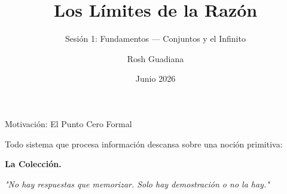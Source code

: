 \documentclass[10pt, aspectratio=169]{beamer}
\title{Los Límites de la Razón}
\subtitle{Sesión 1: Fundamentos — Conjuntos y el Infinito}
\author{Rosh Guadiana}
\date{Junio 2026}
\begin{document}
\maketitle

\begin{frame}{Motivación: El Punto Cero Formal}
    \begin{center}
        \Large Todo sistema que procesa información descansa sobre una noción primitiva: 
        
        \vspace{0.5cm}
        \alert{\textbf{La Colección.}}
        
        \vspace{1.5cm}
        \normalsize
        \textit{"No hay respuestas que memorizar. Solo hay demostración o no la hay."}
    \end{center}
\end{frame}
\end{document}
